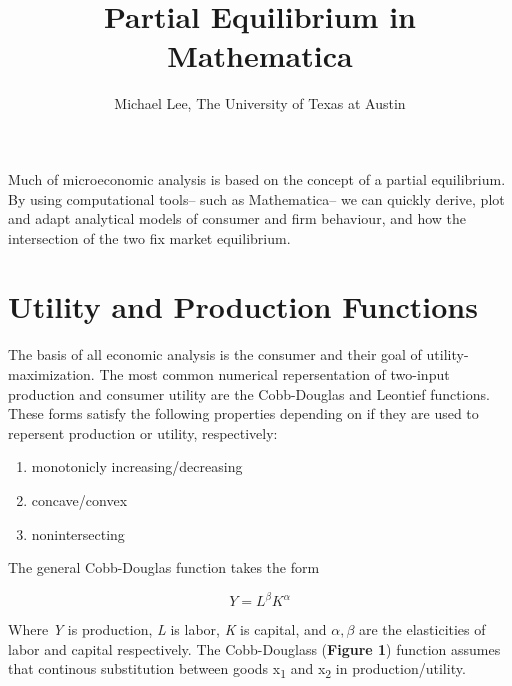 \documentclass{article}
\title{Partial Equilibrium in Mathematica}
\author{Michael Lee, The University of Texas at Austin}
\begin{document}
\maketitle{}

Much of microeconomic analysis is based on the concept of a partial equilibrium. By using computational tools-- such as Mathematica-- we can quickly derive, plot and adapt analytical models of consumer and firm behaviour, and how the intersection of the two fix market equilibrium. 

\newpage

\section{Utility and Production Functions}

The basis of all economic analysis is the consumer and their goal of utility-maximization. The most common numerical repersentation of two-input production and consumer utility are the Cobb-Douglas and Leontief functions. These forms satisfy the following properties depending on if they are used to repersent production or utility, respectively:

\begin{center}
	\begin{enumerate}
		\item monotonicly increasing/decreasing
		\item concave/convex
		\item nonintersecting
	\end{enumerate}
\end{center}

The general Cobb-Douglas function takes the form

$$ Y = L^{\beta}K^{\alpha} $$

Where \emph{Y} is production, \emph{L} is labor, \emph{K} is capital, and $\alpha , \beta$ are the elasticities of labor and capital respectively. The Cobb-Douglass ({\bf Figure 1}) function assumes that continous substitution between goods x\textsubscript{1} and x\textsubscript{2} in production/utility.
\end{document}
